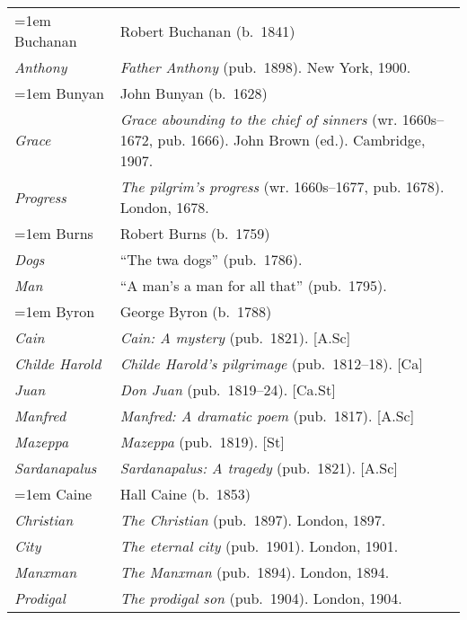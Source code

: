 \begin{xltabular}{\textwidth}{ lQ }
\hangindent=1em  Buchanan & Robert Buchanan (b.~1841)\\
\hspace{1em}\textit{Anthony} & \textit{Father Anthony} (pub.~1898). New York, 1900. \\ %

\hangindent=1em  Bunyan & John Bunyan (b.~1628) \\
\hspace{1em}\textit{Grace} & \textit{Grace abounding to the chief of sinners} (wr. 1660s--1672, pub. 1666). John Brown (ed.). Cambridge, 1907. \\
\hspace{1em}\textit{Progress} & \textit{The pilgrim's progress} (wr. 1660s--1677, pub. 1678). London, 1678. \\

\hangindent=1em  Burns & Robert Burns (b.~1759) \\
\hspace{1em}\textit{Dogs} & ``The twa dogs'' (pub.~1786). \\
\hspace{1em}\textit{Man} & ``A man's a man for all that'' (pub.~1795). \\

\hangindent=1em  Byron & George Byron (b.~1788) \\
\hspace{1em}\textit{Cain} & \textit{Cain: A mystery} (pub.~1821). [A.Sc] \\
\hspace{1em}\textit{Childe Harold} & \textit{Childe Harold's pilgrimage} (pub.~1812--18). [Ca] \\
\hspace{1em}\textit{Juan} & \textit{Don Juan} (pub.~1819--24). [Ca.St] \\
\hspace{1em}\textit{Manfred} & \textit{Manfred: A dramatic poem} (pub.~1817). [A.Sc] \\
\hspace{1em}\textit{Mazeppa} & \textit{Mazeppa} (pub.~1819). [St] \\
\hspace{1em}\textit{Sardana\-palus} & \textit{Sardanapalus: A tragedy} (pub.~1821). [A.Sc] \\

\hangindent=1em  Caine & Hall Caine (b.~1853) \\
\hspace{1em}\textit{Christian} & \textit{The Christian} (pub.~1897). London, 1897.  \\
\hspace{1em}\textit{City} & \textit{The eternal city} (pub.~1901). London, 1901. \\
\hspace{1em}\textit{Manxman} & \textit{The Manxman} (pub.~1894). London, 1894. \\
\hspace{1em}\textit{Prodigal} & \textit{The prodigal son} (pub.~1904). London, 1904. \\


\end{xltabular}
